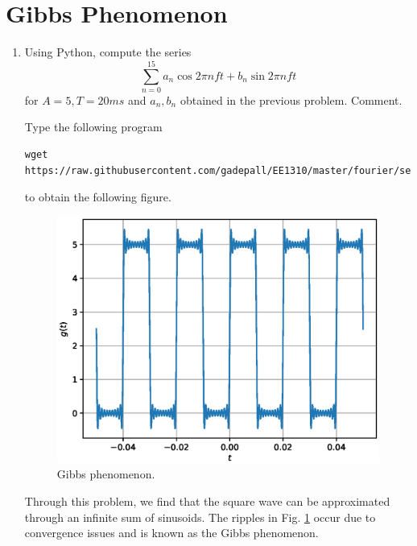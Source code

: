 \documentclass[journal,12pt,twocolumn]{IEEEtran}
\renewcommand\thesection{\arabic{section}}
\begin{document}
\section{Gibbs Phenomenon}
%
\begin{enumerate}[label=\thesection.\arabic*
,ref=\thesection.\theenumi]

\item
Using Python, compute the series 
%
\begin{equation}
\sum_{n=0}^{15}a_n\cos 2\pi n f t + b_n \sin 2 \pi n f t
\end{equation}
%
for $A=5, T= 20 ms$ and $a_n,b_n$ obtained in the previous problem.  Comment.
%
\label{fourier_series}

\solution  Type the following program
%
\begin{lstlisting}
wget https://raw.githubusercontent.com/gadepall/EE1310/master/fourier/series/codes/1.4.py
\end{lstlisting}
%
to obtain the following figure.
\begin{figure}[!h]
\centering

\includegraphics[width=\columnwidth]{./figs/1.4.eps}
\caption{Gibbs phenomenon.}
\label{fig:1.4}
\end{figure}
%
Through this problem, we find that the square wave can be approximated through an infinite sum of sinusoids. The ripples in Fig. \ref{fig:1.4} occur due to convergence issues and is known as the Gibbs phenomenon.
%
%
\end{enumerate}
\end{document}
